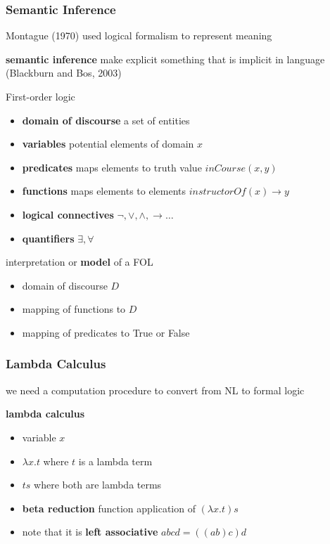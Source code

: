 \documentclass[]{article}
\theoremstyle{definition}
\begin{document}
\subsubsection{Semantic Inference}%
\label{ssub:semantic_inference}

Montague (1970) used logical formalism to represent meaning

\textbf{semantic inference} make explicit something that is implicit in language (Blackburn and Bos, 2003)

First-order logic
\begin{itemize}
    \item \textbf{domain of discourse} a set of entities
    \item \textbf{variables} potential elements of domain $x$
    \item \textbf{predicates} maps elements to truth value $inCourse(x,y)$
    \item \textbf{functions} maps elements to elements $instructorOf(x) \to y$
    \item \textbf{logical connectives} $\neg, \vee, \wedge, \to \ldots$
    \item \textbf{quantifiers} $\exists, \forall$
\end{itemize}
interpretation or \textbf{model} of a FOL
\begin{itemize}
    \item domain of discourse $D$
    \item mapping of functions to $D$
    \item mapping of predicates to True or False
\end{itemize}

\subsubsection{Lambda Calculus}%
\label{ssub:lambda_calculus}

we need a computation procedure to convert from NL to formal logic

\textbf{lambda calculus}
\begin{itemize}
    \item variable $x$
    \item $\lambda x.t$ where $t$ is a lambda term
    \item $ts$ where both are lambda terms
    \item \textbf{beta reduction} function application of $(\lambda x.t)s$
    \item note that it is \textbf{left associative} $abcd = ((ab)c)d$
\end{itemize}
\end{document}
